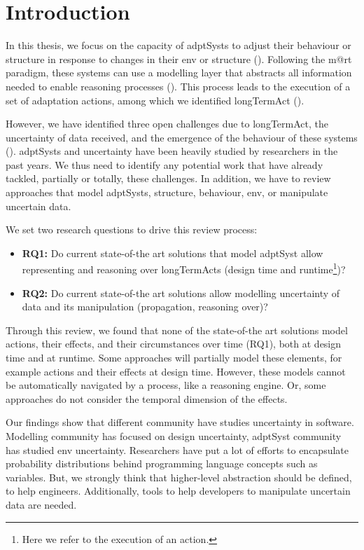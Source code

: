 \section{Introduction}

In this thesis, we focus on the capacity of \glspl{adptSyst} to adjust their \gls{behaviour} or \gls{structure} in response to changes in their \gls{env} or \gls{structure} (\cf {}).
Following the \gls{m@rt} paradigm, these systems can use a modelling layer that abstracts all information needed to enable reasoning processes (\cf {}).
This process leads to the execution of a set of adaptation \glspl{action}, among which we identified \gls{longTermAct} (\cf {}).

However, we have identified three open challenges due to \gls{longTermAct}, the uncertainty of data received, and the emergence of the \gls{behaviour} of these systems (\cf {}).
\Glspl{adptSyst} and uncertainty have been heavily studied by researchers in the past years.
We thus need to identify any potential work that have already tackled, partially or totally, these challenges.
In addition, we have to review approaches that model \glspl{adptSyst}, \gls{structure}, \gls{behaviour}, \gls{env}, or manipulate uncertain data.

We set two research questions to drive this review process:
\begin{itemize}
	\item \textbf{RQ1:} Do current state-of-the art solutions that model \gls{adptSyst} allow representing and reasoning over \glspl{longTermAct} (design time and runtime\footnote{Here we refer to the execution of an \gls{action}.})? 
	\item \textbf{RQ2:} Do current state-of-the art solutions allow modelling uncertainty of data and its manipulation (propagation, reasoning over)? 
\end{itemize} 

Through this review, we found that none of the state-of-the art solutions model \glspl{action}, their effects, and their \glspl{circumstance} over time (RQ1), both at design time and at runtime.
Some approaches will partially model these elements, for example \glspl{action} and their effects at design time.
However, these models cannot be automatically navigated by a process, like a reasoning engine.
Or, some approaches do not consider the temporal dimension of the effects.

Our findings show that different community have studies uncertainty in software.
Modelling community has focused on design uncertainty, \gls{adptSyst} community has studied \gls{env} uncertainty.
Researchers have put a lot of efforts to encapsulate probability distributions behind programming language concepts such as variables.
But, we strongly think that higher-level abstraction should be defined, to help engineers.
Additionally, tools to help developers to manipulate uncertain data are needed.

